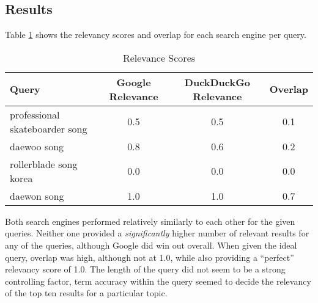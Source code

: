 \subsection{Results}
Table \ref{tab:11comparison} shows the relevancy scores and overlap for each search engine per query.

\begin{table}[h!]
\centering
\begin{tabular}{| l | c | c | c |}
\hline
Query & Google Relevance & DuckDuckGo Relevance & Overlap \\
\hline
professional skateboarder song & 0.5 & 0.5 & 0.1 \\
daewoo song & 0.8 & 0.6 & 0.2 \\
rollerblade song korea & 0.0 & 0.0 & 0.0 \\
daewon song & 1.0 & 1.0 & 0.7 \\
\hline
\end{tabular}
\caption{Relevance Scores}
\label{tab:11comparison}
\end{table}

Both search engines performed relatively similarly to each other for the given queries.  Neither one provided a \textit{significantly} higher number of relevant results for any of the queries, although Google did win out overall.  When given the ideal query, overlap was high, although not at 1.0, while also providing a ``perfect'' relevancy score of 1.0.  The length of the query did not seem to be a strong controlling factor, term accuracy within the query seemed to decide the relevancy of the top ten results for a particular topic.
